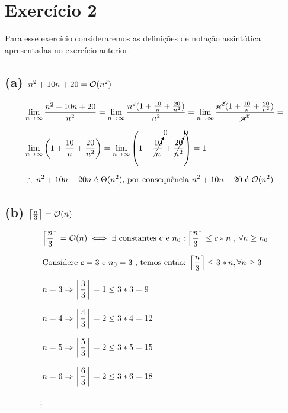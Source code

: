 \section*{Exercício 2}
Para esse exercício consideraremos as definições de notação assintótica apresentadas no exercício anterior.
\subsection*{(a) $n^2 + 10n + 20 = \bigO(n^2)$}

\begin{equation*}
  \setlength{\jot}{10pt}
  \begin{aligned}
    &\lim_{n \to\infty} \frac{n^2 + 10n + 20}{n^2} = \lim_{n \to\infty} \frac{n^{2}(1 + \frac{10}{n} + \frac{20}{n^2})}{n^{2}} = \lim_{n \to\infty} \frac{\cancel{n^{2}}(1 + \frac{10}{n} + \frac{20}{n^2})}{\cancel{n^{2}}} = \\
    & \lim_{n \to\infty} \left(1 + \frac{10}{n} + \frac{20}{n^2}\right) = \lim_{n \to\infty} \left(1 + \cancelto{0}{\frac{10}{n}} + \cancelto{0}{\frac{20}{n^2}}\right) = 1 \\
    &\therefore\: n^2 + 10n + 20 n \text{ é } \Theta(n^2) \text{, por consequência } n^2 + 10n + 20 \text{ é } \bigO(n^2)
\end{aligned}\end{equation*}


\subsection*{(b) $\ceil*{\frac{n}{3}} = \bigO(n)$}

\begin{equation*}
  \setlength{\jot}{10pt}
  \begin{aligned}
    &\ceil*{\frac{n}{3}} = \bigO(n) \iff \exists \text{ constantes c e $n_0$}: \ceil*{\frac{n}{3}} \leq c*n \text{ , } \forall n \geq n_0 \\
    &\text{Considere $c = 3$ e $n_0 = 3$ , temos então: } \ceil*{\frac{n}{3}} \leq 3*n, \forall n \geq 3 \\
    & n = 3 \Rightarrow \ceil*{\frac{3}{3}} = 1 \leq 3*3 = 9 \\
    & n = 4 \Rightarrow \ceil*{\frac{4}{3}} = 2 \leq 3*4 = 12 \\
    & n = 5 \Rightarrow \ceil*{\frac{5}{3}} = 2 \leq 3*5 = 15 \\
    & n = 6 \Rightarrow \ceil*{\frac{6}{3}} = 2 \leq 3*6 = 18 \\
    \vdots
\end{aligned}\end{equation*}

